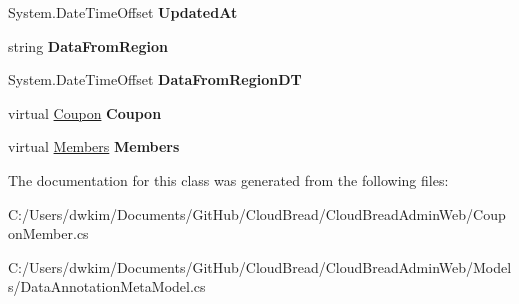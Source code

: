 \begin{DoxyCompactItemize}
\item 
System.\+Date\+Time\+Offset {\bfseries Updated\+At}\hypertarget{a00069_a98501fd61e738dcbd3bbc1c0dc49e197}{}\label{a00069_a98501fd61e738dcbd3bbc1c0dc49e197}

\item 
string {\bfseries Data\+From\+Region}\hypertarget{a00069_a4e62bbbe69715f9f1ca5bcab6e044075}{}\label{a00069_a4e62bbbe69715f9f1ca5bcab6e044075}

\item 
System.\+Date\+Time\+Offset {\bfseries Data\+From\+Region\+DT}\hypertarget{a00069_a0b5762a9c8cabeb5920de76a70ebd360}{}\label{a00069_a0b5762a9c8cabeb5920de76a70ebd360}

\item 
virtual \hyperlink{a00068}{Coupon} {\bfseries Coupon}\hypertarget{a00069_ade32f4d6b2f399031de304dec97816f6}{}\label{a00069_ade32f4d6b2f399031de304dec97816f6}

\item 
virtual \hyperlink{a00145}{Members} {\bfseries Members}\hypertarget{a00069_a3806e7f3eee773d2e0e2b02e46cae9cc}{}\label{a00069_a3806e7f3eee773d2e0e2b02e46cae9cc}

\end{DoxyCompactItemize}


The documentation for this class was generated from the following files\+:\begin{DoxyCompactItemize}
\item 
C\+:/\+Users/dwkim/\+Documents/\+Git\+Hub/\+Cloud\+Bread/\+Cloud\+Bread\+Admin\+Web/Coupon\+Member.\+cs\item 
C\+:/\+Users/dwkim/\+Documents/\+Git\+Hub/\+Cloud\+Bread/\+Cloud\+Bread\+Admin\+Web/\+Models/Data\+Annotation\+Meta\+Model.\+cs\end{DoxyCompactItemize}
